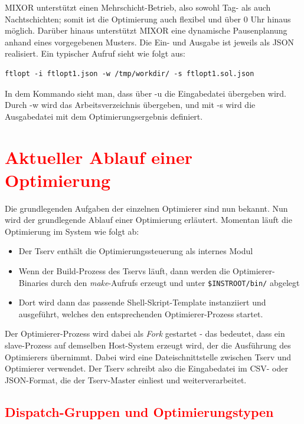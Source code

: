 MIXOR unterstützt einen Mehrschicht-Betrieb, also sowohl Tag- als auch Nachtschichten; somit ist die Optimierung auch flexibel und über 0 Uhr hinaus möglich. Darüber hinaus unterstützt MIXOR eine dynamische Pausenplanung anhand eines vorgegebenen Musters. Die Ein- und Ausgabe ist jeweils als JSON realisiert. Ein typischer Aufruf sieht wie folgt aus:

\begin{verbatim}
ftlopt -i ftlopt1.json -w /tmp/workdir/ -s ftlopt1.sol.json
\end{verbatim}

In dem Kommando sieht man, dass über -u die Eingabedatei übergeben wird. Durch -w wird das Arbeitsverzeichnis übergeben, und mit -s wird die Ausgabedatei mit dem Optimierungsergebnis definiert.

\section{\textcolor{red}{Aktueller Ablauf einer Optimierung}}


Die grundlegenden Aufgaben der einzelnen Optimierer sind nun bekannt. Nun wird der grundlegende Ablauf einer Optimierung erläutert. Momentan läuft die Optimierung im System wie folgt ab:
\begin{itemize}
    \item Der Tserv enthält die Optimierungssteuerung als internes Modul
    \item Wenn der Build-Prozess des Tservs läuft, dann werden die Optimierer-Binaries durch den \textit{make}-Aufrufs erzeugt und unter \texttt{\$INSTROOT/bin/} abgelegt
    \item Dort wird dann das passende Shell-Skript-Template instanziiert und ausgeführt, welches den entsprechenden Optimierer-Prozess startet.
\end{itemize}

Der Optimierer-Prozess wird dabei als \textit{Fork} gestartet - das bedeutet, dass ein slave-Prozess auf demselben Host-System erzeugt wird, der die Ausführung des Optimierers übernimmt. Dabei wird eine Dateischnittstelle zwischen Tserv und Optimierer verwendet. Der Tserv schreibt also die Eingabedatei im CSV- oder JSON-Format, die der Tserv-Master einliest und weiterverarbeitet.

\subsection{\textcolor{red}{Dispatch-Gruppen und Optimierungstypen}}

